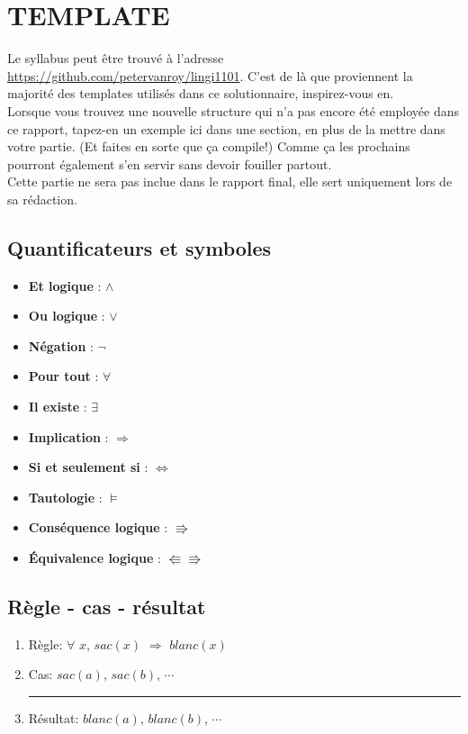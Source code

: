 \chapter*{TEMPLATE}
Le syllabus peut être trouvé à l'adresse \url{https://github.com/petervanroy/lingi1101}.
C'est de là que proviennent la majorité des templates utilisés dans ce solutionnaire, inspirez-vous en.\\
Lorsque vous trouvez une nouvelle structure qui n'a pas encore été employée dans ce rapport, tapez-en un exemple ici dans une section, en plus de la mettre dans votre partie.
(Et faites en sorte que ça compile!)
Comme ça les prochains pourront également s'en servir sans devoir fouiller partout.\\
Cette partie ne sera pas inclue dans le rapport final, elle sert uniquement lors de sa rédaction.

\section*{Quantificateurs et symboles}
\begin{itemize}
    \item \textbf{Et logique} : $\land$
    \item \textbf{Ou logique} : $\lor$
    \item \textbf{Négation} : $\neg$
    \item \textbf{Pour tout} : $\forall$
    \item \textbf{Il existe} : $\exists$
    \item \textbf{Implication} : $\Rightarrow$
    \item \textbf{Si et seulement si} : $\Leftrightarrow$
    \item \textbf{Tautologie} : $\models$
    \item \textbf{Conséquence logique} : $\Rrightarrow$
    \item \textbf{Équivalence logique} : $\Lleftarrow \Rrightarrow$
\end{itemize}


\section*{Règle - cas - résultat}
\begin{enumerate}
  \item Règle: $\forall$ $x$, $sac(x)$ $\Rightarrow$ $blanc(x)$
  \item Cas: $sac(a)$, $sac(b)$, $\cdots$\\
  \rule{5.5cm}{.1pt} 
  \item Résultat: $blanc(a)$, $blanc(b)$, $\cdots$
\end{enumerate}

